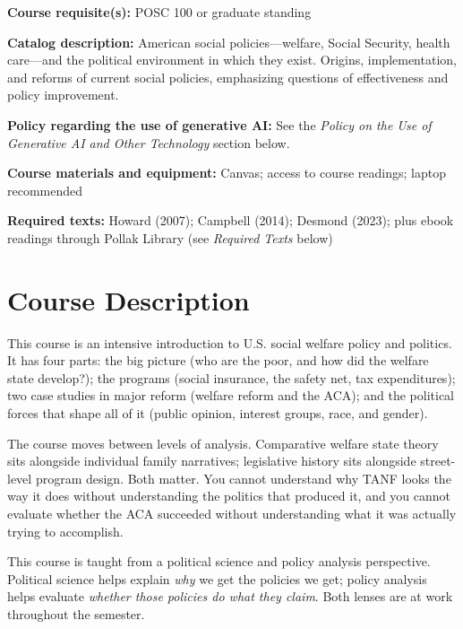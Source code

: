 \documentclass[12pt]{article}
\begin{document}
\vspace{0.5em}
\begin{flatlist}
\item \textbf{Course requisite(s):} POSC 100 or graduate standing
\item \textbf{Catalog description:} American social policies---welfare, Social Security, health care---and the political environment in which they exist. Origins, implementation, and reforms of current social policies, emphasizing questions of effectiveness and policy improvement.
\item \textbf{Policy regarding the use of generative AI:} See the \emph{Policy on the Use of Generative AI and Other Technology} section below.
\item \textbf{Course materials and equipment:} Canvas; access to course readings; laptop recommended
\item \textbf{Required texts:} Howard (2007); Campbell (2014); Desmond (2023); plus ebook readings through Pollak Library (see \emph{Required Texts} below)
\end{flatlist}

\section*{Course Description}

{\setlength{\parindent}{0pt}\setlength{\parskip}{0.6\baselineskip}%
This course is an intensive introduction to U.S. social welfare policy and politics. It has four parts: the big picture (who are the poor, and how did the welfare state develop?); the programs (social insurance, the safety net, tax expenditures); two case studies in major reform (welfare reform and the ACA); and the political forces that shape all of it (public opinion, interest groups, race, and gender).

The course moves between levels of analysis. Comparative welfare state theory sits alongside individual family narratives; legislative history sits alongside street-level program design. Both matter. You cannot understand why TANF looks the way it does without understanding the politics that produced it, and you cannot evaluate whether the ACA succeeded without understanding what it was actually trying to accomplish.

This course is taught from a political science and policy analysis perspective. Political science helps explain \emph{why} we get the policies we get; policy analysis helps evaluate \emph{whether those policies do what they claim}. Both lenses are at work throughout the semester.
}
\end{document}
